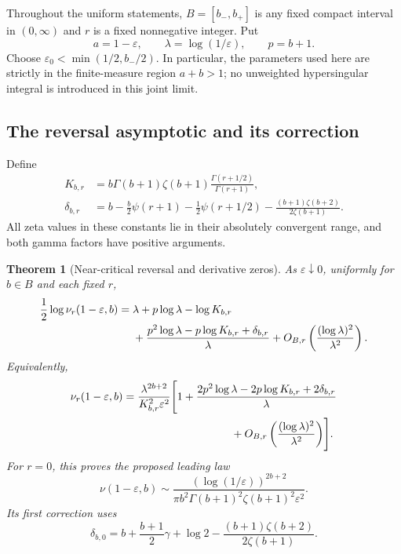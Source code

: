 \documentclass[11pt,a4paper]{article}
\numberwithin{equation}{section}
\newtheorem{theorem}{Theorem}[section]
\theoremstyle{definition}
\theoremstyle{remark}
\begin{document}
Throughout the uniform statements, $B=[b_-,b_+]$ is any fixed compact
interval in $(0,\infty)$ and $r$ is a fixed nonnegative integer. Put
\[
 a=1-\varepsilon,\qquad
 \lambda=\log(1/\varepsilon),\qquad p=b+1.
\]
Choose $\varepsilon_0<\min(1/2,b_-/2)$. In particular, the parameters
used here are strictly in the finite-measure region $a+b>1$; no
unweighted hypersingular integral is introduced in this joint limit.

\subsection{The reversal asymptotic and its correction}

Define
\begin{align}
 K_{b,r}&=b\Gamma(b+1)\zeta(b+1)
              \frac{\Gamma(r+1/2)}{\Gamma(r+1)},
 \label{eutrans:eq:K}\\
 \delta_{b,r}&=b-\frac b2\psi(r+1)-\frac12\psi(r+1/2)
      -\frac{(b+1)\zeta(b+2)}{2\zeta(b+1)}.
 \label{eutrans:eq:delta}
\end{align}
All zeta values in these constants lie in their absolutely convergent
range, and both gamma factors have positive arguments.

\begin{theorem}[Near-critical reversal and derivative zeros]
\label{eutrans:thm:crossing}
As $\varepsilon\downarrow0$, uniformly for $b\in B$ and each fixed $r$,
\begin{align}
 \frac12\log\nu_r(1-\varepsilon,b)
 ={}&\lambda+p\log\lambda-\log K_{b,r}\notag\\
 &+\frac{p^2\log\lambda-p\log K_{b,r}+\delta_{b,r}}{\lambda}
 +O_{B,r}\left(\frac{(\log\lambda)^2}{\lambda^2}\right).
 \label{eutrans:eq:Lroot}
\end{align}
Equivalently,
\begin{align}
 \nu_r(1-\varepsilon,b)
 ={}&\frac{\lambda^{2b+2}}{K_{b,r}^2\varepsilon^2}
 \Biggl[1+
 \frac{2p^2\log\lambda-2p\log K_{b,r}+2\delta_{b,r}}{\lambda}
 \notag\\
 &\hspace{30mm}+O_{B,r}\left(\frac{(\log\lambda)^2}{\lambda^2}\right)
 \Biggr].
 \label{eutrans:eq:nuroot}
\end{align}
For $r=0$, this proves the proposed leading law
\begin{equation}\label{eutrans:eq:conjecture}
 \nu(1-\varepsilon,b)\sim
 \frac{(\log(1/\varepsilon))^{2b+2}}
 {\pi b^2\Gamma(b+1)^2\zeta(b+1)^2\varepsilon^2}.
\end{equation}
Its first correction uses
\begin{equation}\label{eutrans:eq:delta0}
 \delta_{b,0}=b+\frac{b+1}{2}\gamma+\log2
                   -\frac{(b+1)\zeta(b+2)}{2\zeta(b+1)}.
\end{equation}
\end{theorem}
\end{document}
